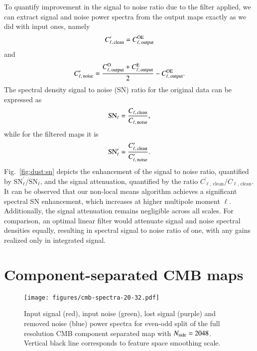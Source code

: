 \documentclass{aa}
\newcommand{\nside}{\ensuremath N_{\text{side}}}
\begin{document}
To quantify improvement in the signal to noise ratio due to the filter applied, we can extract signal and noise power spectra from the output maps exactly as we did with input ones, namely
%
\begin{equation}
    C^{\prime}_{\ell, \, \rm clean} = C^{\rm OE}_{\ell, \, \rm output}
\end{equation}
%
and
%
\begin{equation}
    C^{\prime}_{\ell, \, \rm noise} = \frac{C^{\rm O}_{\ell, \, \rm output} + C^{\rm E}_{\ell, \, \rm output}}{2} - C^{\rm OE}_{\ell, \, \rm output} .
\end{equation}
%
The spectral density signal to noise (SN) ratio for the original data can be expressed as
%
\begin{equation}
    \text{SN}_\ell = \frac{C_{\ell, \, \rm clean}}{C_{\ell, \, \rm noise}} ,
\end{equation}
%
while for the filtered maps it is
%
\begin{equation}
    \text{SN}^{\prime}_\ell = \frac{C^{\prime}_{\ell, \, \rm clean}}{C^{\prime}_{\ell, \, \rm noise}} .
\end{equation}
%
Fig.~\ref{fig:dust:sn} depicts the enhancement of the signal to noise ratio, quantified by ${\text{SN}^{\prime}_\ell} / {\text{SN}_\ell}$, and the signal attenuation, quantified by the ratio $C_{\ell, \, \text{clean}}^{\prime} / C_{\ell, \, \text{clean}}$. It can be observed that our non-local means algorithm achieves a significant spectral SN enhancement, which increases at higher multipole moment $\ell$. Additionally, the signal attenuation remains negligible across all scales. For comparison, an optimal linear filter would attenuate signal and noise spectral densities equally, resulting in spectral signal to noise ratio of one, with any gains realized only in integrated signal.


\section{Component-separated CMB maps}
\label{sec:cmb}

\begin{figure}
    \centering
    \texttt{[image: figures/cmb-spectra-20-32.pdf]}
    \caption{Input signal (red), input noise (green), lost signal (purple) and removed noise (blue) power spectra for even-odd split of the full resolution CMB component separated map with $\nside=2048$. Vertical black line corresponds to feature space smoothing scale.}
    \label{fig:cmb:spectra}
\end{figure}
\end{document}
